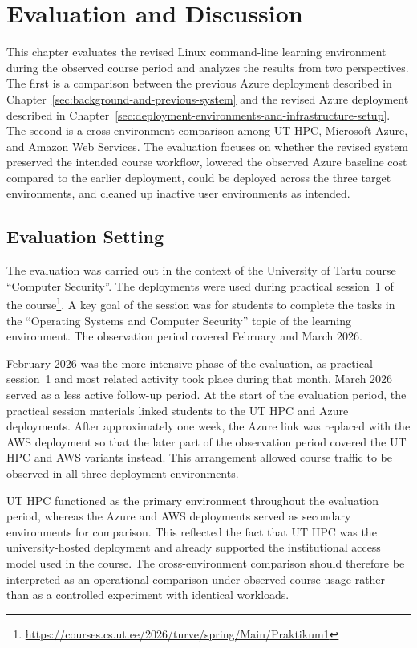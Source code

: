 \section{Evaluation and Discussion} \label{sec:evaluation-and-discussion}
This chapter evaluates the revised Linux command-line learning environment during the observed course period and analyzes the results from two perspectives.
The first is a comparison between the previous Azure deployment described in Chapter~\ref{sec:background-and-previous-system} and the revised Azure deployment described in Chapter~\ref{sec:deployment-environments-and-infrastructure-setup}.
The second is a cross-environment comparison among UT HPC, Microsoft Azure, and Amazon Web Services.
The evaluation focuses on whether the revised system preserved the intended course workflow, lowered the observed Azure baseline cost compared to the earlier deployment, could be deployed across the three target environments, and cleaned up inactive user environments as intended.

\subsection{Evaluation Setting} \label{subsec:evaluation-setting}
The evaluation was carried out in the context of the University of Tartu course ``Computer Security''.
The deployments were used during practical session~1 of the course\footnote{\url{https://courses.cs.ut.ee/2026/turve/spring/Main/Praktikum1}}.
A key goal of the session was for students to complete the tasks in the ``Operating Systems and Computer Security'' topic of the learning environment.
The observation period covered February and March 2026.

February 2026 was the more intensive phase of the evaluation, as practical session~1 and most related activity took place during that month.
March 2026 served as a less active follow-up period.
At the start of the evaluation period, the practical session materials linked students to the UT HPC and Azure deployments.
After approximately one week, the Azure link was replaced with the AWS deployment so that the later part of the observation period covered the UT HPC and AWS variants instead.
This arrangement allowed course traffic to be observed in all three deployment environments.

UT HPC functioned as the primary environment throughout the evaluation period, whereas the Azure and AWS deployments served as secondary environments for comparison.
This reflected the fact that UT HPC was the university-hosted deployment and already supported the institutional access model used in the course.
The cross-environment comparison should therefore be interpreted as an operational comparison under observed course usage rather than as a controlled experiment with identical workloads.

